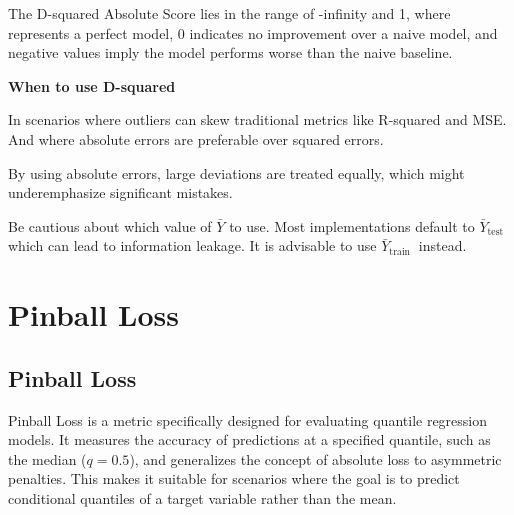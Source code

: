 The D-squared Absolute Score lies in the range of -infinity and 1, where represents a perfect model, 0 indicates no improvement over a naive model,
and negative values imply the model performs worse than the naive baseline.

\textbf{When to use D-squared}

In scenarios where outliers can skew traditional metrics like R-squared and MSE. And where absolute errors are preferable over squared errors.

{
    \item By using absolute errors, large deviations are treated equally, which might underemphasize significant mistakes.
    \item Be cautious about which value of $\bar{Y}$ to use. Most implementations default to $\bar{Y}_{\text {test }}$ which can lead to information leakage. It is advisable to use $\bar{Y}_{\text {train }}$ instead.
}


\clearpage
\thispagestyle{regressionstyle}
\section{Pinball Loss}
\subsection{Pinball Loss }

Pinball Loss is a metric specifically designed for evaluating quantile regression models. It measures the accuracy of predictions at a specified quantile, such as the median ($q=0.5$),
and generalizes the concept of absolute loss to asymmetric penalties. This makes it suitable for scenarios where the goal is to predict conditional quantiles of a target variable
rather than the mean.

\begin{center}
\end{center}


